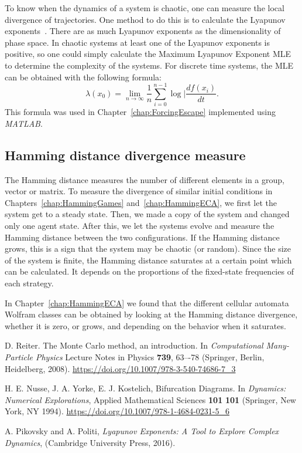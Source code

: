 To know when the dynamics of a system is chaotic, one can measure the local divergence of trajectories. One method to do this is to calculate the Lyapunov exponents~\cite{LyaExp}. There are as much Lyapunov exponents as the dimensionality of phase space. In chaotic systems at least one of the Lyapunov exponents is positive, so one could simply calculate the Maximum Lyapunov Exponent MLE to determine the complexity of the systems. For discrete time systems, the MLE can be obtained with the following formula:
\begin{equation}
\lambda(x_0) = \lim_{n \to \infty}\dfrac{1}{n}\sum_{i=0}^{n-1}\log|\dfrac{df(x_i)}{dt}.
\end{equation}
This formula was used in Chapter~\ref{chap:ForcingEscape} implemented using \textit{MATLAB}.

\subsection{Hamming distance divergence measure}

The Hamming distance measures the number of different elements in a group, vector or matrix. To measure the divergence of similar initial conditions in Chapters~\ref{chap:HammingGames} and~\ref{chap:HammingECA}, we first let the system get to a steady state. Then, we made a copy of the system and changed only one agent state. After this, we let the systems evolve and measure the Hamming distance between the two configurations. If the Hamming distance grows, this is a sign that the system may be chaotic (or random). Since the size of the system is finite, the Hamming distance saturates at a certain point which can be calculated. It depends on the proportions of the fixed-state frequencies of each strategy.

In Chapter~\ref{chap:HammingECA} we found that the different cellular automata Wolfram classes can be obtained by looking at the Hamming distance divergence, whether it is zero, or grows, and depending on the behavior when it saturates.



\begin{thebibliography}{02}


D. Reiter. The Monte Carlo method, an introduction. In \textit{Computational Many-Particle Physics}
Lecture Notes in  Physics \textbf{739}, 63–-78 (Springer, Berlin, Heidelberg, 2008).
\url{https://doi.org/10.1007/978-3-540-74686-7_3}


H. E. Nusse, J. A. Yorke, E. J. Kostelich, 
Bifurcation Diagrams. In \textit{Dynamics: Numerical Explorations},
Applied Mathematical Sciences \textbf{101} \textbf{101} (Springer, New York, NY 1994).
\url{https://doi.org/10.1007/978-1-4684-0231-5_6}


A. Pikovsky and A. Politi, 
\textit{Lyapunov Exponents: A Tool to Explore Complex Dynamics},
(Cambridge University Press, 2016).




\end{thebibliography}
